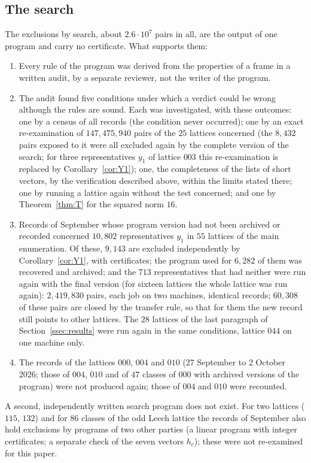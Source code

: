 \documentclass[11pt]{amsart}
\theoremstyle{definition}
\theoremstyle{remark}
\begin{document}
\subsection*{The search} The exclusions by search, about $2.6\cdot10^7$ pairs in all, are the output of one program and
carry no certificate. What supports them:
\begin{enumerate}[leftmargin=2em]
\item Every rule of the program was derived from the properties of a frame in a written audit, by a separate reviewer, not the writer of the program.
\item The audit found five conditions under which a verdict could be wrong although the rules are sound. Each was
investigated, with these outcomes: one by a census of all records (the condition never occurred); one by an exact re-examination of
$147{,}475{,}940$ pairs of the $25$ lattices concerned (the $8{,}432$ pairs exposed to it were all excluded again by the
complete version of the search; for three representatives $y_1$ of lattice $003$ this re-examination is replaced by
Corollary~\ref{cor:Y1}); one, the completeness of the lists of short vectors, by the verification described above, within
the limits stated there; one by running a lattice again without the test concerned; and one by Theorem~\ref{thm:T} for the
squared norm $16$.
\item Records of September whose program version had not been archived or recorded concerned $10{,}802$ representatives
$y_1$ in $55$ lattices of the main enumeration. Of these, $9{,}143$ are excluded independently by Corollary~\ref{cor:Y1}, with
certificates; the program used for $6{,}282$ of them was recovered and archived; and the $713$ representatives that had
neither were run again with the final version (for sixteen lattices the whole lattice was run again): $2{,}419{,}830$ pairs,
each job on two machines, identical records; $60{,}308$ of these pairs are closed by the transfer rule, so that for them
the new record still points to other lattices. The $28$ lattices of the last paragraph of Section~\ref{ssec:results} were
run again in the same conditions, lattice $044$ on one machine only.
\item The records of the lattices $000$, $004$ and $010$ (27 September to 2 October 2026; those of $004$, $010$ and of $47$
classes of $000$ with archived versions of the program) were not produced again; those of $004$ and $010$ were recounted.
\end{enumerate}
A second, independently written search program does not exist. For two lattices ($115$, $132$) and for $86$
classes of the odd Leech lattice the records of September also hold exclusions by programs of two other parties (a linear
program with integer certificates; a separate check of the seven vectors $h_c$); these were not re-examined for this paper.
\end{document}
